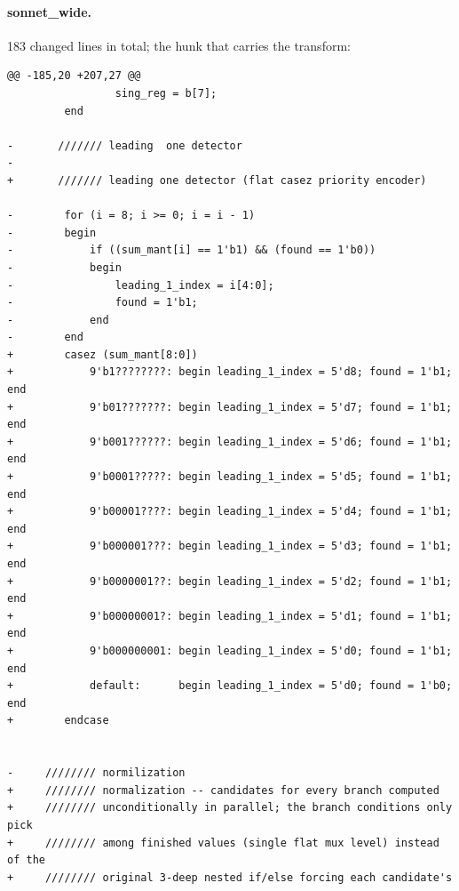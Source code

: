 \paragraph{sonnet\_wide.} 183 changed lines in total; the hunk that carries the transform:
\begin{lstlisting}[style=diff]
@@ -185,20 +207,27 @@
                 sing_reg = b[7];
         end
 
-       /////// leading  one detector 
-       
+       /////// leading one detector (flat casez priority encoder)
 
-        for (i = 8; i >= 0; i = i - 1)
-        begin
-            if ((sum_mant[i] == 1'b1) && (found == 1'b0))
-            begin
-                leading_1_index = i[4:0];
-                found = 1'b1;
-            end
-        end
+        casez (sum_mant[8:0])
+            9'b1????????: begin leading_1_index = 5'd8; found = 1'b1; end
+            9'b01???????: begin leading_1_index = 5'd7; found = 1'b1; end
+            9'b001??????: begin leading_1_index = 5'd6; found = 1'b1; end
+            9'b0001?????: begin leading_1_index = 5'd5; found = 1'b1; end
+            9'b00001????: begin leading_1_index = 5'd4; found = 1'b1; end
+            9'b000001???: begin leading_1_index = 5'd3; found = 1'b1; end
+            9'b0000001??: begin leading_1_index = 5'd2; found = 1'b1; end
+            9'b00000001?: begin leading_1_index = 5'd1; found = 1'b1; end
+            9'b000000001: begin leading_1_index = 5'd0; found = 1'b1; end
+            default:      begin leading_1_index = 5'd0; found = 1'b0; end
+        endcase
 
 
-     //////// normilization 
+     //////// normalization -- candidates for every branch computed
+     //////// unconditionally in parallel; the branch conditions only pick
+     //////// among finished values (single flat mux level) instead of the
+     //////// original 3-deep nested if/else forcing each candidate's
\end{lstlisting}
